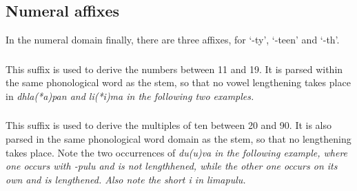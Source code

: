 \subsection{Numeral affixes}\label{sec:morph:Numeralaffixes}
In the numeral domain finally, there are three affixes, for `-ty', `-teen' and `-th'.

\subsubsection{}\label{sec:morph:-blas}
This suffix is used to derive the numbers between 11 and 19. It is parsed within the same phonological word as the stem, so that no vowel lengthening takes place in \em dhla(*a)pan \em and \em li(*i)ma \em in the following two examples.


 


\subsubsection{}\label{sec:morph:-pulu}
This suffix is used to derive the multiples of ten between 20 and 90. It is also parsed in the same phonological word domain as the stem, so that no lengthening takes place. Note the two occurrences of \em du(u)va \em in the following example, where one occurs with \em -pulu \em  and is not lengthhened, while the other one occurs on its own and is lengthened. Also note the short \em i \em in \em limapulu\em.



